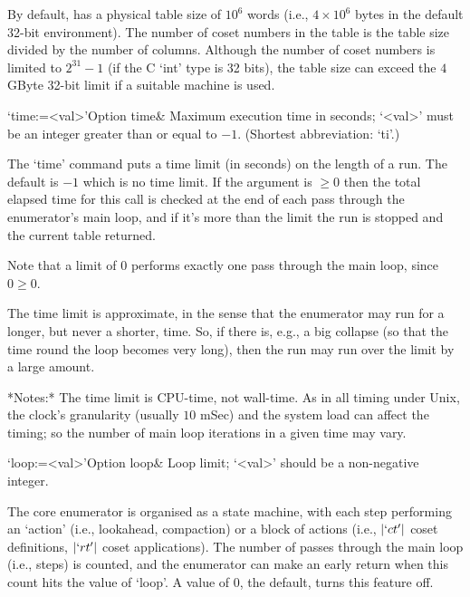 By default, {\ACE} has a physical table size of $10^6$ words (i.e., $4
\times 10^6$ bytes in the  default 32-bit environment).  The number of
coset numbers in the table is  the table size divided by the number of
columns.   Although  the  number   of  coset  numbers  is  limited  to
$2^{31}-1$ (if the C `int' type is 32 bits), the table size can exceed
the $4$GByte 32-bit limit if a suitable machine is used.

\>`time:=<val>'{Option time}&
Maximum execution time in seconds; `<val>' must be an integer  greater
than or equal to $-1$. (Shortest abbreviation: `ti'.)

The `time' command  puts a time limit (in seconds) on  the length of a
run. The default is $-1$  which is no  time limit. If the  argument is
$\ge0$ then the total elapsed time for this call is checked at the end
of each pass through the enumerator's main loop, and if it's more than
the limit the run is stopped and the current table returned.

Note that a limit of $0$ performs exactly one pass  through  the  main
loop, since $0 \ge 0$.

%
%
%

The time  limit is approximate, in  the sense that  the enumerator may
run for a longer, but never a shorter, time.  So, if there is, e.g., a
big collapse (so that the time round the loop becomes very long), then
the run may run over the limit by a large amount.

*Notes:*
The time  limit is  CPU-time, not wall-time.   As in all  timing under
Unix, the clock's granularity (usually  $10$ mSec) and the system load
can affect  the timing;  so the  number of main  loop iterations  in a
given time may vary.

\>`loop:=<val>'{Option loop}&
Loop limit; `<val>' should be a non-negative integer.

The core enumerator is organised as a state machine,  with  each  step
performing an \lq{}action' (i.e., lookahead, compaction) or a block of
actions   (i.e.,   $|`ct'|$   coset   definitions,   $|`rt'|$    coset
applications). The number of  passes  through  the  main  loop  (i.e.,
steps) is counted, and the enumerator can make an  early  return  when
this count hits the value of `loop'. A  value  of  $0$,  the  default,
turns this feature off.

